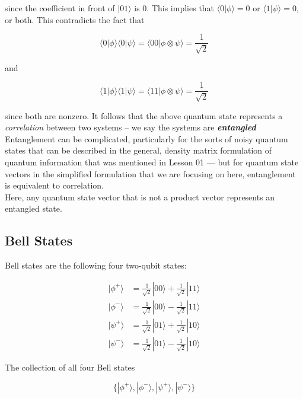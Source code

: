 \documentclass[svgnames]{article}     %
\begin{document}
since the coefficient in front of $|01\rangle $ is 0. This implies that $\langle 0 | \phi\rangle = 0$ or $\langle 1 | \psi\rangle = 0$, or both. This contradicts the fact that 

\[
  \langle 0 | \phi \rangle \langle 0 | \psi \rangle = \langle 00 | \phi\otimes\psi\rangle = \frac{1}{\sqrt{2}}
\] \vspace{5px}

and 

\[
  \langle 1 | \phi \rangle \langle 1 | \psi \rangle = \langle 11 | \phi\otimes\psi \rangle = \frac{1}{\sqrt{2}}
\] \vspace{5px}

since both are nonzero.  It follows that the above quantum state represents a \textit{correlation}
between two systems -- we say the systems are \textit{ \textbf{entangled}}\\ 


Entanglement can be complicated, particularly for the sorts of noisy quantum
states that can be described in the general, density matrix formulation of
quantum information that was mentioned in Lesson 01 — but for quantum state
vectors in the simplified formulation that we are focusing on here,
entanglement is equivalent to correlation. \\ Here, any quantum state vector that is not a product vector represents an entangled state. \\

\subsection{Bell States}

Bell states are the following four two-qubit states: 

\begin{align*}
  |\phi^+\rangle &= \frac{1}{\sqrt{2}} |00\rangle + \frac{1}{\sqrt{2}}|11\rangle \\
  |\phi^-\rangle &= \frac{1}{\sqrt{2}} |00\rangle - \frac{1}{\sqrt{2}}|11\rangle \\
  |\psi^+\rangle &= \frac{1}{\sqrt{2}} |01\rangle + \frac{1}{\sqrt{2}}|10\rangle \\ 
  |\psi^-\rangle &= \frac{1}{\sqrt{2}}|01\rangle - \frac{1}{\sqrt{2}}|10\rangle 
\end{align*}

The collection of all four Bell states

\[
  \{ |\phi^+\rangle , |\phi^-\rangle , |\psi^+\rangle , |\psi^-\rangle \} 
\] \vspace{5px}
\end{document}

